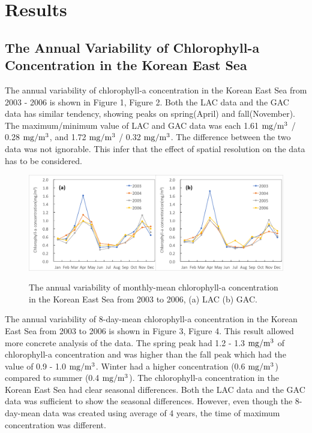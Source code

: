 
\section{Results}
 
\subsection{The Annual Variability of Chlorophyll-a Concentration in the Korean East Sea}
 
The annual variability of chlorophyll-a concentration in the Korean East Sea from 2003 - 2006 is shown in Figure 1, Figure 2. Both the LAC data and the GAC data has similar tendency, showing peaks on spring(April) and fall(November). The maximum/minimum value of LAC and GAC data was each 1.61 $\rm mg/m^3$ / 0.28 $\rm mg/m^3$, and 1.72 $\rm mg/m^3$ / 0.32 $\rm mg/m^3$. The difference between the two data was not ignorable. This infer that the effect of spatial resolution on the data has to be considered.
   
 \begin{figure}[b]
 	\centering
 	\includegraphics[width=0.8\linewidth]{../images/annualmon}\\
 	\caption{The annual variability of monthly-mean chlorophyll-a concentration in the Korean East Sea from 2003 to 2006, (a) LAC (b) GAC.}
 	\label{fig:annualmon}
 \end{figure}
 
The annual variability of 8-day-mean chlorophyll-a concentration in the Korean East Sea from 2003 to 2006 is shown in Figure 3, Figure 4. This result allowed more concrete analysis of the data. The spring peak had 1.2 - 1.3 $\rm mg/m^3$ of chlorophyll-a concentration and was higher than the fall peak which had the value of 0.9 - 1.0 $\rm mg/m^3$. Winter had a higher concentration (0.6 $\rm mg/m^3$) compared to summer (0.4 $\rm mg/m^3$). The chlorophyll-a concentration in the Korean East Sea had clear seasonal differences. Both the LAC data and the GAC data was sufficient to show the seasonal differences. However, even though the 8-day-mean data was created using average of 4 years, the time of maximum concentration was different. 

